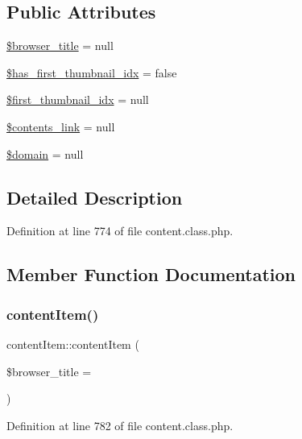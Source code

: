 \subsection*{Public Attributes}
\begin{DoxyCompactItemize}
\item 
\hyperlink{classcontentItem_abaf3b2f2d6878f8568161f4fce4e80bf}{\$browser\+\_\+title} = null
\item 
\hyperlink{classcontentItem_a78da7867160d34bf7e422524f6a78c37}{\$has\+\_\+first\+\_\+thumbnail\+\_\+idx} = false
\item 
\hyperlink{classcontentItem_a3ed95afadefbe20bd085e1d88220f4b1}{\$first\+\_\+thumbnail\+\_\+idx} = null
\item 
\hyperlink{classcontentItem_a6bf076b1d98025ee3f1d847fcf1fd29f}{\$contents\+\_\+link} = null
\item 
\hyperlink{classcontentItem_a428d40bc2148eae5661822963ba819b4}{\$domain} = null
\end{DoxyCompactItemize}


\subsection{Detailed Description}


Definition at line 774 of file content.\+class.\+php.



\subsection{Member Function Documentation}
\hypertarget{classcontentItem_a6d43634cb803585fa2a0feb13f63fad4}{}\label{classcontentItem_a6d43634cb803585fa2a0feb13f63fad4} 
\subsubsection{\texorpdfstring{content\+Item()}{contentItem()}}
{\footnotesize\ttfamily content\+Item\+::content\+Item (\begin{DoxyParamCaption}\item[{}]{\$browser\+\_\+title = {\ttfamily \textquotesingle{}\textquotesingle{}} }\end{DoxyParamCaption})}



Definition at line 782 of file content.\+class.\+php.

